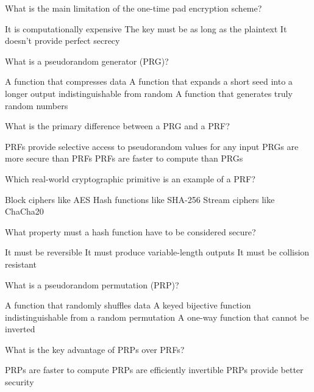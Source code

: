 \documentclass[10pt,a4paper,american]{exam}
\begin{document}
\begin{questions}
	\question What is the main limitation of the one-time pad encryption scheme?
	\begin{randomizechoices}
		\choice It is computationally expensive
		\CorrectChoice The key must be as long as the plaintext
		\choice It doesn't provide perfect secrecy
	\end{randomizechoices}

	\question What is a pseudorandom generator (PRG)?
	\begin{randomizechoices}
		\choice A function that compresses data
		\CorrectChoice A function that expands a short seed into a longer output indistinguishable from random
		\choice A function that generates truly random numbers
	\end{randomizechoices}

	\question What is the primary difference between a PRG and a PRF?
	\begin{randomizechoices}
		\CorrectChoice PRFs provide selective access to pseudorandom values for any input
		\choice PRGs are more secure than PRFs
		\choice PRFs are faster to compute than PRGs
	\end{randomizechoices}

	\question Which real-world cryptographic primitive is an example of a PRF?
	\begin{randomizechoices}
		\choice Block ciphers like AES
		\CorrectChoice Hash functions like SHA-256
		\choice Stream ciphers like ChaCha20
	\end{randomizechoices}

	\question What property must a hash function have to be considered secure?
	\begin{randomizechoices}
		\choice It must be reversible
		\choice It must produce variable-length outputs
		\CorrectChoice It must be collision resistant
	\end{randomizechoices}

	\question What is a pseudorandom permutation (PRP)?
	\begin{randomizechoices}
		\choice A function that randomly shuffles data
		\CorrectChoice A keyed bijective function indistinguishable from a random permutation
		\choice A one-way function that cannot be inverted
	\end{randomizechoices}

	\question What is the key advantage of PRPs over PRFs?
	\begin{randomizechoices}
		\choice PRPs are faster to compute
		\CorrectChoice PRPs are efficiently invertible
		\choice PRPs provide better security
	\end{randomizechoices}


\end{questions}
\end{document}
